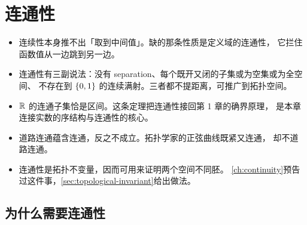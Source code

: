\chapter{连通性}
\label{ch:connectedness}

\begin{keypoint}[本章要点]
  \begin{itemize}
    \item 连续性本身推不出「取到中间值」。缺的那条性质是定义域的连通性，
          它拦住函数值从一边跳到另一边。
    \item 连通性有三副说法：没有 separation、每个既开又闭的子集或为空集或为全空间、
          不存在到 \(\left\{0,1\right\}\) 的连续满射。三者都不提距离，可推广到拓扑空间。
    \item \(\mathbb{R}\) 的连通子集恰是区间。这条定理把连通性接回第 1 章的确界原理，
          是本章连接实数的序结构与连通性的核心。
    \item 道路连通蕴含连通，反之不成立。拓扑学家的正弦曲线既紧又连通，
          却不道路连通。
    \item 连通性是拓扑不变量，因而可用来证明两个空间不同胚。
          \cref{ch:continuity}预告过这件事，\cref{sec:topological-invariant}给出做法。
  \end{itemize}
\end{keypoint}

\section{为什么需要连通性}
\label{sec:why-connected}

